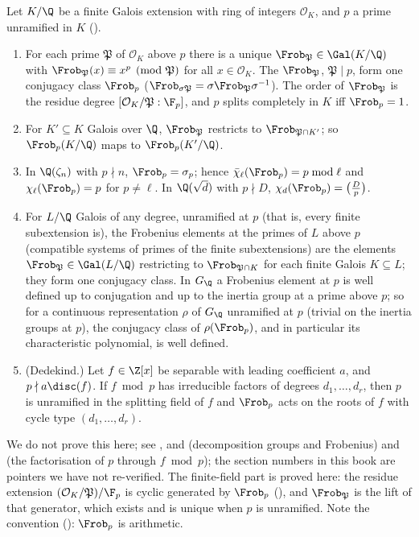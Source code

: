 \begin{theorem}\label{thm:galois:frobenius}
Let $K/\Q$ be a finite Galois extension with ring of integers $\mathcal{O}_K$, and $p$ a prime unramified in $K$ ().
\begin{enumerate}[label=(\alph*)]
\item For each prime $\mathfrak P$ of $\mathcal{O}_K$ above $p$ there is a unique $\Frob_{\mathfrak P}\in\Gal(K/\Q)$ with $\Frob_{\mathfrak P}(x)\equiv x^p\pmod{\mathfrak P}$
for all $x\in\mathcal{O}_K$. The $\Frob_{\mathfrak P}$, $\mathfrak P\mid p$, form one conjugacy class $\Frob_p$ ($\Frob_{\sigma\mathfrak P}=\sigma\Frob_{\mathfrak P}\sigma^{-1}$). The order
of $\Frob_{\mathfrak P}$ is the residue degree $[\mathcal{O}_K/\mathfrak P:\F_p]$, and $p$ splits completely in $K$ iff $\Frob_p=1$.
\item For $K'\subseteq K$ Galois over $\Q$, $\Frob_{\mathfrak P}$ restricts to $\Frob_{\mathfrak P\cap K'}$; so $\Frob_p(K/\Q)$ maps to $\Frob_p(K'/\Q)$.
\item In $\Q(\zeta_n)$ with $p\nmid n$, $\Frob_p=\sigma_p$; hence $\bar\chi_\ell(\Frob_p)=p\bmod\ell$ and $\chi_\ell(\Frob_p)=p$ for $p\ne\ell$. In $\Q(\sqrt d)$ with $p\nmid D$,
$\chi_d(\Frob_p)=\bigl(\frac Dp\bigr)$.
\item For $L/\Q$ Galois of any degree, unramified at $p$ (that is, every finite subextension is), the Frobenius elements at the primes of $L$ above $p$ (compatible
systems of primes of the finite subextensions) are the elements $\Frob_{\mathfrak P}\in\Gal(L/\Q)$ restricting to $\Frob_{\mathfrak P\cap K}$ for each finite Galois $K\subseteq L$;
they form one conjugacy class. In $G_\Q$ a Frobenius element at $p$ is well defined up to conjugation and up to the inertia group at a prime above $p$; so for a
continuous representation $\rho$ of $G_\Q$ unramified at $p$ (trivial on the inertia groups at $p$), the conjugacy class of $\rho(\Frob_p)$, and in particular its
characteristic polynomial, is well defined.
\item (Dedekind.) Let $f\in\Z[x]$ be separable with leading coefficient $a$, and $p\nmid a\disc(f)$. If $f\bmod p$ has irreducible factors of degrees $d_1,\dots,d_r$, then
$p$ is unramified in the splitting field of $f$ and $\Frob_p$ acts on the roots of $f$ with cycle type $(d_1,\dots,d_r)$.
\end{enumerate}
\end{theorem}

We do not prove this here; see , and \cite[Chapter I, Section 9]{Neukirch} (decomposition groups and Frobenius) and \cite[Chapter I, Section 8]{Neukirch}
(the factorisation of $p$ through $f\bmod p$); the section numbers in this book are pointers we have not re-verified. The finite-field part is proved here: the
residue extension $(\mathcal{O}_K/\mathfrak P)/\F_p$ is cyclic generated by $\Frob_p$ (), and $\Frob_{\mathfrak P}$ is the lift of that
generator, which exists and is unique when $p$ is unramified. Note the convention (): $\Frob_p$ is arithmetic.

